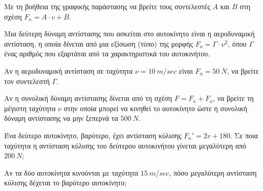 {\begin{alist}
\item Με τη βοήθεια της γραφικής παράστασης να βρείτε τους συντελεστές $A$ και $B$ στη σχέση $F_\kappa = A \cdot v + B$.
\item Μια δεύτερη δύναμη αντίστασης που ασκείται στο αυτοκίνητο είναι η αεροδυναμική αντίσταση, η οποία δίνεται από μια εξίσωση (τύπο) της μορφής $F_a = \Gamma \cdot \nu^{2}$, όπου $\Gamma$ ένας αριθμός που εξαρτάται από τα χαρακτηριστικά του αυτοκινήτου.

\begin{rlist}
\item Αν η αεροδυναμική αντίσταση σε ταχύτητα $\nu = 10\ \si{m/sec}$ είναι $F_a = 50\ \si{N}$, να βρείτε τον συντελεστή $\Gamma$.
\item Αν η συνολική δύναμη αντίστασης δίνεται από τη σχέση $F = F_\kappa + F_a$, να βρείτε τη μέγιστη ταχύτητα $\nu$ στην οποία μπορεί να κινηθεί το αυτοκίνητο ώστε η συνολική δύναμη αντίστασης να μην ξεπερνά τα $500\ N$.
\end{rlist}
\end{alist}}
\begin{alist}[start=3]
\item Ένα δεύτερο αυτοκίνητο, βαρύτερο, έχει αντίσταση κύλισης $F_\kappa' = 2v + 180$. Σε ποια ταχύτητα η αντίσταση κύλισης του δεύτερου αυτοκινήτου γίνεται μεγαλύτερη από $200\ \si{N}$;
\item Αν τα δύο αυτοκίνητα κινούνται με ταχύτητα $15\ \si{m/sec}$, πόσο μεγαλύτερη αντίσταση κύλισης δέχεται το βαρύτερο αυτοκίνητο;

\end{alist}

